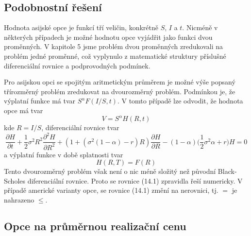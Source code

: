 \documentclass[a4paper]{book}
\begin{document}
\subsection{Podobnostní řešení}

Hodnota asijské opce je funkcí tří veličin, konkrétně $S$, $I$ a $t$. Nicméně v některých případech je možné hodnotu opce vyjádřit jako funkci dvou proměnných. V kapitole 5 jsme problém dvou proměnných zredukovali na problém jedné proměnné, což vyplynulo z matematické struktury příslušné diferenciální rovnice a podprovodných podmínek.

Pro asijskou opci se spojitým aritmetickým průměrem je možné výše popsaný třírozměrný problém zredukovat na dvourozměrný problém. Podmínkou je, že výplatní funkce má tvar $S^{\alpha}F(I/S,t)$. V tomto případě lze odvodit, že hodnota opce má tvar
\begin{equation*}
V = S^{\alpha}H(R,t)
\end{equation*}
kde $R = I/S$, diferenciální rovnice tvar
\begin{equation}
\frac{\partial H}{\partial t} + \frac{1}{2}\sigma^2 R^2 \frac{\partial^2 H}{\partial R^2} + (1 + (\sigma^2(1 - \alpha) -r)R)\frac{\partial H}{\partial R} - (1 - \alpha)\Big(\frac{1}{2}\sigma^2 \alpha + r \Big)H = 0
\end{equation}
a výplatní funkce v době splatnosti tvar
\begin{equation*}
H(R,T) = F(R)
\end{equation*}
Tento dvourozměrný problém však není o nic méně složitý než původní Black-Scholes diferenciální rovnice. Proto se rovnice (14.1) zpravidla řeší numericky. V případě americké varianty opce, se rovnice (14.1) změní na nerovnici, tj. $=$ je nahrazeno $\le$.

\subsection{Opce na průměrnou realizační cenu}
\end{document}
